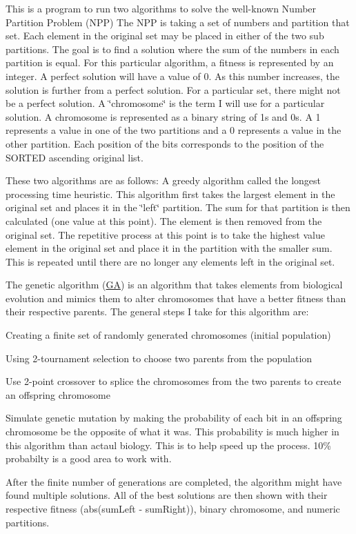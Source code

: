 This is a program to run two algorithms to solve the well-\/known Number Partition Problem (N\+PP) The N\+PP is taking a set of numbers and partition that set. Each element in the original set may be placed in either of the two sub partitions. The goal is to find a solution where the sum of the numbers in each partition is equal. For this particular algorithm, a fitness is represented by an integer. A perfect solution will have a value of 0. As this number increases, the solution is further from a perfect solution. For a particular set, there might not be a perfect solution. A \char`\"{}chromosome\char`\"{} is the term I will use for a particular solution. A chromosome is represented as a binary string of 1\textquotesingle{}s and 0\textquotesingle{}s. A 1 represents a value in one of the two partitions and a 0 represents a value in the other partition. Each position of the bits corresponds to the position of the S\+O\+R\+T\+ED ascending original list.

These two algorithms are as follows\+: A greedy algorithm called the longest processing time heuristic. This algorithm first takes the largest element in the original set and places it in the \char`\"{}left\char`\"{} partition. The sum for that partition is then calculated (one value at this point). The element is then removed from the original set. The repetitive process at this point is to take the highest value element in the original set and place it in the partition with the smaller sum. This is repeated until there are no longer any elements left in the original set.

The genetic algorithm (\hyperlink{class_g_a}{GA}) is an algorithm that takes elements from biological evolution and mimics them to alter chromosomes that have a better fitness than their respective parents. The general steps I take for this algorithm are\+:


\begin{DoxyItemize}
\item Creating a finite set of randomly generated chromosomes (initial population)
\item Using 2-\/tournament selection to choose two parents from the population
\item Use 2-\/point crossover to splice the chromosomes from the two parents to create an offspring chromosome
\item Simulate genetic mutation by making the probability of each bit in an offspring chromosome be the opposite of what it was. This probability is much higher in this algorithm than actaul biology. This is to help speed up the process. 10\% probabilty is a good area to work with.
\end{DoxyItemize}

After the finite number of generations are completed, the algorithm might have found multiple solutions. All of the best solutions are then shown with their respective fitness (abs(sum\+Left -\/ sum\+Right)), binary chromosome, and numeric partitions. 